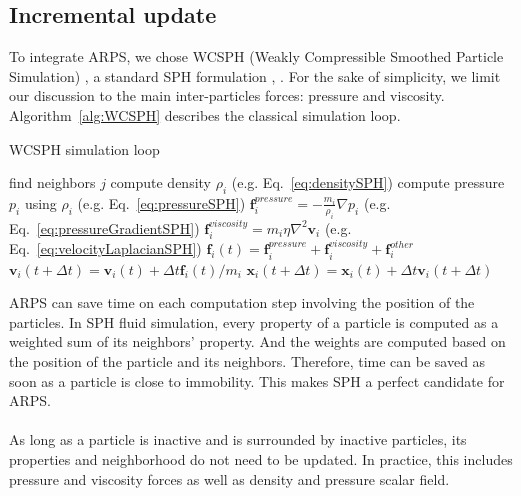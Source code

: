 \subsection{ Incremental update }
To integrate ARPS, we chose WCSPH (Weakly Compressible Smoothed Particle Simulation) \cite{Becker2007WCSPH}, a standard SPH formulation \cite{Desbrun1996}, \cite{Muller2003}. For the sake of simplicity, we limit our discussion to the main inter-particles forces: pressure and viscosity. 
Algorithm~\ref{alg:WCSPH} describes the classical simulation loop.
\begin{algorithm}[H]
    \caption[ARPS: WCSPH simulation]{WCSPH simulation loop}
    \label{alg:WCSPH}
    \begin{algorithmic}
	    \State find neighbors $j$
    \EndFor
    \State compute density $\rho_{i}$ (e.g. Eq.~\ref{eq:densitySPH})
    \State compute pressure $p_{i}$ using $\rho_{i}$ (e.g. Eq.~\ref{eq:pressureSPH})
    \EndFor
    \State $\displaystyle \mathbf{f}_{i}^{pressure} = -\frac{m_{i}}{\rho_{i}}\nabla p_{i}$ (e.g. Eq.~\ref{eq:pressureGradientSPH})
    \State $\displaystyle \mathbf{f}_{i}^{viscosity} = m_{i}\eta\nabla^{2}\mathbf{v}_{i}$ (e.g. Eq.~\ref{eq:velocityLaplacianSPH})
    \State $\displaystyle \mathbf{f}_{i}(t) = \mathbf{f}_{i}^{pressure} + \mathbf{f}_{i}^{viscosity} + \mathbf{f}_{i}^{other}$
    \EndFor
    \State $\mathbf{v}_{i}(t+\Delta t) = \mathbf{v}_{i}(t) + \Delta t \mathbf{f}_{i}(t)/m_{i}$
    \State $\mathbf{x}_{i}(t+\Delta t) = \mathbf{x}_{i}(t) + \Delta t \mathbf{v}_{i}(t+\Delta t)$
    \EndFor
    \end{algorithmic}
\end{algorithm}
ARPS can save time on each computation step involving the position of the particles.
In SPH fluid simulation, every property of a particle is computed as a weighted sum of its neighbors' property.
And the weights are computed based on the position of the particle and its neighbors.
Therefore, time can be saved as soon as a particle is close to immobility. 
This makes SPH a perfect candidate for ARPS.
\\ \\
As long as a particle is inactive and is surrounded by inactive particles, its properties and neighborhood do not need to be updated.
In practice, this includes pressure and viscosity forces as well as density and pressure scalar field.
\\ \\
